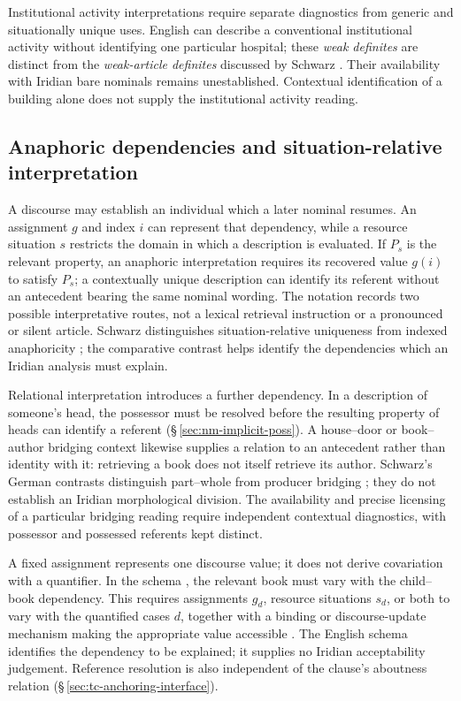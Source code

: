 Institutional activity interpretations require separate diagnostics from
generic and situationally unique uses. English 
can describe a conventional institutional activity without identifying one
particular hospital; these \emph{weak definites} are distinct from the
\emph{weak-article definites} discussed by Schwarz
\cite[§§\,1--2, 4.1]{williams2019}. Their availability with Iridian bare
nominals remains unestablished. Contextual identification of a building
alone does not supply the institutional activity reading.

\subsection{Anaphoric dependencies and situation-relative interpretation}
\label{sec:nm-reference-indices}

A discourse may establish an individual which a later nominal resumes.
An assignment \(g\) and index \(i\) can represent that dependency, while a
resource situation \(s\) restricts the domain in which a description is
evaluated. If \(P_s\) is the relevant property, an anaphoric interpretation
requires its recovered value \(g(i)\) to satisfy \(P_s\); a contextually
unique description can identify its referent without an antecedent bearing
the same nominal wording. The notation records two possible interpretative
routes, not a lexical retrieval instruction or a pronounced or silent article.
Schwarz distinguishes situation-relative uniqueness from indexed
anaphoricity \cite[§§\,2.3--2.4]{schwarz2019}; the comparative contrast
helps identify the dependencies which an Iridian analysis must explain.

Relational interpretation introduces a further dependency. In a description
of someone's head, the possessor must be resolved before the resulting
property of heads can identify a referent (§\,\ref{sec:nm-implicit-poss}).
A house--door or book--author bridging context likewise supplies a relation
to an antecedent rather than identity with it: retrieving a book does not
itself retrieve its author. Schwarz's German contrasts distinguish
part--whole from producer bridging \cite[§\,2.3, examples~(11)--(12)]{schwarz2019};
they do not establish an Iridian morphological division. The availability
and precise licensing of a particular bridging reading require independent
contextual diagnostics, with possessor and possessed referents kept distinct.

A fixed assignment represents one discourse value; it does not derive
covariation with a quantifier. In the schema , the relevant book must vary with the child--book
dependency. This requires assignments \(g_d\), resource situations \(s_d\),
or both to vary with the quantified cases \(d\), together with a binding or
discourse-update mechanism making the appropriate value accessible
\cite[§\,2.4 and note~10]{schwarz2019}. The English schema identifies the
dependency to be explained; it supplies no Iridian acceptability judgement.
Reference resolution is also independent of the clause's aboutness relation
(§\,\ref{sec:tc-anchoring-interface}).

